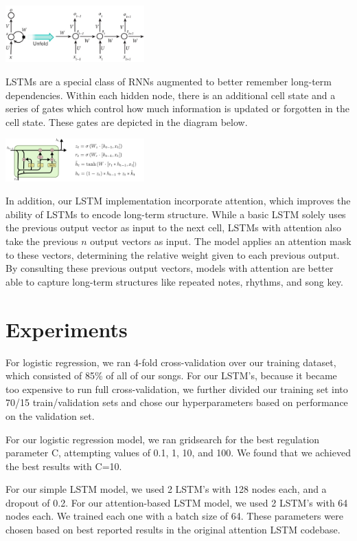 \documentclass[twoside,twocolumn]{article}
\begin{document}
\includegraphics[width = 0.4\textwidth]{rnn-diagram}

LSTMs are a special class of RNNs augmented to better remember long-term dependencies. Within each hidden node, there is an additional cell state and a series of gates which control how much information is updated or forgotten in the cell state. These gates are depicted in the diagram below.

\includegraphics[width = 0.4\textwidth]{colah-lstm-diagram}

In addition, our LSTM implementation incorporate attention, which improves the ability of LSTMs to encode long-term structure. While a basic LSTM solely uses the previous output vector as input to the next cell, LSTMs with attention also take the previous $n$ output vectors as input. The model applies an attention mask to these vectors, determining the relative weight given to each previous output. By consulting these previous output vectors, models with attention are better able to capture long-term structures like repeated notes, rhythms, and song key. \\


\section{Experiments}

For logistic regression, we ran 4-fold cross-validation over our training dataset, which consisted of 85\% of all of our songs. For our LSTM's, because it became too expensive to run full cross-validation, we further divided our training set into 70/15 train/validation sets and chose our hyperparameters based on performance on the  validation set. 

For our logistic regression model, we ran gridsearch for the best regulation parameter C, attempting values of 0.1, 1, 10, and 100. We found that we achieved the best results with C=10. 

For our simple LSTM model, we used 2 LSTM's with 128 nodes each, and a dropout of 0.2. For our attention-based LSTM model, we used 2 LSTM's with 64 nodes each. We trained each one with a batch size of 64. These parameters were chosen based on best reported results in the original attention LSTM codebase.
\end{document}
